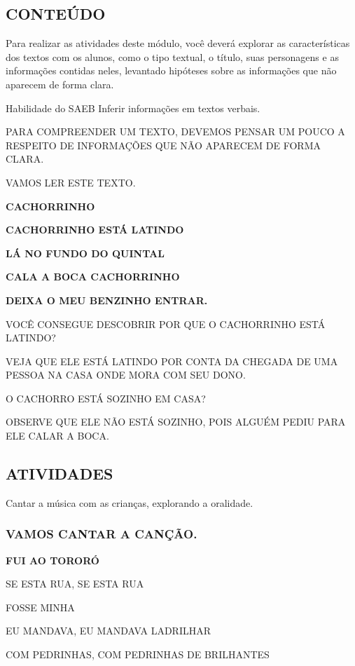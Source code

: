 \subsection{CONTEÚDO}\label{conteuxfado-5}

Para realizar as atividades deste módulo, você deverá explorar as características dos textos com os alunos, como o tipo textual, o título, suas personagens e as informações contidas neles, levantado hipóteses sobre as informações que não aparecem de forma clara. 

Habilidade do SAEB 
Inferir informações em textos verbais.

PARA COMPREENDER UM TEXTO, DEVEMOS PENSAR UM POUCO
A RESPEITO DE INFORMAÇÕES QUE NÃO APARECEM DE FORMA CLARA.

VAMOS LER ESTE TEXTO.

\textbf{CACHORRINHO}

\textbf{CACHORRINHO ESTÁ LATINDO}

\textbf{LÁ NO FUNDO DO QUINTAL}

\textbf{CALA A BOCA CACHORRINHO}

\textbf{DEIXA O MEU BENZINHO ENTRAR.}

VOCÊ CONSEGUE DESCOBRIR POR QUE O CACHORRINHO ESTÁ LATINDO?

VEJA QUE ELE ESTÁ LATINDO POR CONTA DA CHEGADA DE UMA PESSOA NA CASA ONDE MORA
COM SEU DONO.

O CACHORRO ESTÁ SOZINHO EM CASA?

OBSERVE QUE ELE NÃO ESTÁ SOZINHO, POIS ALGUÉM PEDIU PARA ELE CALAR A BOCA.

\subsection{ATIVIDADES}\label{atividades-5}

Cantar a música com as crianças, explorando a oralidade.

\subsubsection{VAMOS CANTAR A
CANÇÃO.}\label{vamos-cantar-a-canuxe7uxe3o.}

\textbf{FUI AO TORORÓ}

SE ESTA RUA, SE ESTA RUA

FOSSE MINHA

EU MANDAVA, EU MANDAVA LADRILHAR 

COM PEDRINHAS, COM PEDRINHAS DE BRILHANTES 

